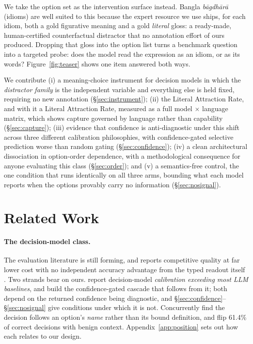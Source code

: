 \documentclass[11pt]{article}
\begin{document}
We take the option set as the intervention surface instead. Bangla
\emph{b\=agdh\=ar\=a} (idioms) are well suited to this because the expert
resource we use ships, for each idiom, both a gold figurative meaning and a gold
\emph{literal} gloss: a ready-made, human-certified counterfactual distractor
that no annotation effort of ours produced. Dropping that gloss into the option
list turns a benchmark question into a targeted probe: does the model read the
expression as an idiom, or as its words? Figure~\ref{fig:teaser} shows one item
answered both ways.

We contribute (i) a meaning-choice instrument for decision models in which the \emph{distractor family} is the independent variable and everything else is held fixed, requiring no new annotation (\S\ref{sec:instrument}); (ii) the Literal Attraction Rate, and with it a Literal Attraction Rate, measured as a full model $\times$ language matrix, which shows capture governed by language rather than capability (\S\ref{sec:capture}); (iii) evidence that confidence is anti-diagnostic under this shift across three different calibration philosophies, with confidence-gated selective prediction worse than random gating (\S\ref{sec:confidence}); (iv) a clean architectural dissociation in option-order dependence, with a methodological consequence for anyone evaluating this class (\S\ref{sec:order}); and (v) a semantics-free control, the one condition that runs identically on all three arms, bounding what each model reports when the options provably carry no information (\S\ref{sec:nosignal}).

\section{Related Work}

\paragraph{The decision-model class.} The evaluation literature is still
forming, and reports competitive quality at far lower cost with no independent
accuracy advantage from the typed readout itself
\citep{tang2026audit,rao2026rubric,ibrahim2026evaluating,guo2026justask,yu2026visualjev}.
Two strands bear on ours. \citet{ibrahim2026evaluating} report decision-model
\emph{calibration exceeding most LLM baselines}, and \citet{li2026jevjudge}
build the confidence-gated cascade that follows from it; both depend on the
returned confidence being diagnostic, and
\S\ref{sec:confidence}--\S\ref{sec:nosignal} give conditions under which it
is not. Concurrently \citet{sun2026typesafe} find the decision follows an
option's \emph{name} rather than its bound definition, and
\citet{xu2026jevout} flip 61.4\% of correct decisions with benign context.
Appendix~\ref{app:position} sets out how each relates to our design.
\end{document}
